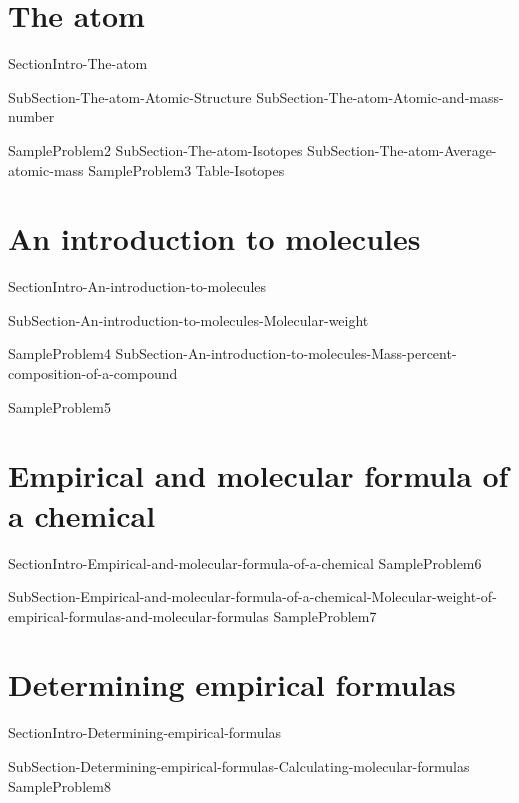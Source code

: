 \documentclass[main.tex]{subfiles}
\newcommand\chapterlabel{Ch-Table}\setcounter{figurenewcounter}{0}\setcounter{tablenewcounter}{0}\setcounter{formulanewcounter}{0}
\begin{document}
\section{The atom}
{SectionIntro-The-atom}
   
\sloppy
\begin{description}
{SubSection-The-atom-Atomic-Structure}
{SubSection-The-atom-Atomic-and-mass-number}
 
 
{SampleProblem2}
{SubSection-The-atom-Isotopes}
{SubSection-The-atom-Average-atomic-mass}
{SampleProblem3}
 {Table-Isotopes}
\end{description}
\section{An introduction to molecules}
{SectionIntro-An-introduction-to-molecules}
\sloppy
\begin{description}
{SubSection-An-introduction-to-molecules-Molecular-weight}
 
{SampleProblem4}
{SubSection-An-introduction-to-molecules-Mass-percent-composition-of-a-compound}
 
{SampleProblem5}
\end{description}
\section{Empirical and molecular formula of a chemical}
{SectionIntro-Empirical-and-molecular-formula-of-a-chemical}
{SampleProblem6}
\sloppy
\begin{description}
{SubSection-Empirical-and-molecular-formula-of-a-chemical-Molecular-weight-of-empirical-formulas-and-molecular-formulas}
{SampleProblem7}
\end{description}
\section{Determining empirical formulas}
{SectionIntro-Determining-empirical-formulas}
\sloppy
\begin{description}
{SubSection-Determining-empirical-formulas-Calculating-molecular-formulas}
{SampleProblem8}
\end{description}
\end{document}
